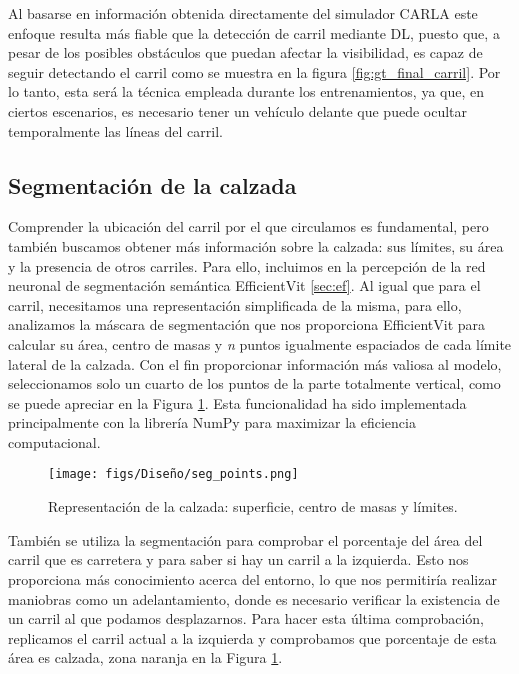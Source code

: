 Al basarse en información obtenida directamente del simulador CARLA este enfoque resulta más fiable que la detección de carril mediante \ac{DL}, puesto que, a pesar de los posibles obstáculos que puedan afectar la visibilidad, es capaz de seguir detectando el carril como se muestra en la figura \ref{fig:gt_final_carril}. Por lo tanto, esta será la técnica empleada durante los entrenamientos, ya que, en ciertos escenarios, es necesario tener un vehículo delante que puede ocultar temporalmente las líneas del carril.

\subsection{Segmentación de la calzada}
\label{sec:per_ef}

Comprender la ubicación del carril por el que circulamos es fundamental, pero también buscamos obtener más información sobre la calzada: sus límites, su área y la presencia de otros carriles. Para ello, incluimos en la percepción de la red neuronal de segmentación semántica EfficientVit \ref{sec:ef}. Al igual que para el carril, necesitamos una representación simplificada de la misma, para ello, analizamos la máscara de segmentación que nos proporciona EfficientVit para calcular su área, centro de masas y \textit{n} puntos igualmente espaciados de cada límite lateral de la calzada. Con el fin proporcionar información más valiosa al modelo, seleccionamos solo un cuarto de los puntos de la parte totalmente vertical, como se puede apreciar en la Figura \ref{fig:seg_params}. Esta funcionalidad ha sido implementada principalmente con la librería NumPy para maximizar la eficiencia computacional.
\begin{figure}[ht]
\centering
\texttt{[image: figs/Diseño/seg\_points.png]}
\caption{Representación de la calzada: superficie, centro de masas y límites.}
\label{fig:seg_params}
\end{figure}

También se utiliza la segmentación para comprobar el porcentaje del área del carril que es carretera y para saber si hay un carril a la izquierda. Esto nos proporciona más conocimiento acerca del entorno, lo que nos permitiría realizar maniobras como un adelantamiento, donde es necesario verificar la existencia de un carril al que podamos desplazarnos. Para hacer esta última comprobación, replicamos el carril actual a la izquierda y comprobamos que porcentaje de esta área es calzada, zona naranja en la Figura \ref{fig:seg_params}.

